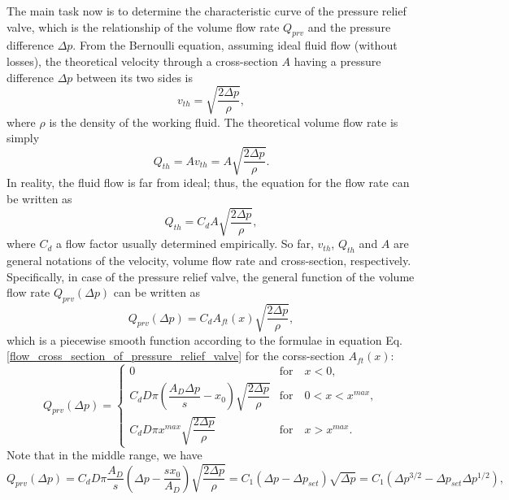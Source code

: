 The main task now is to determine the characteristic curve of the pressure relief valve, which is the relationship of the volume flow rate $Q_{prv}$ and the pressure difference $\Delta p$. From the Bernoulli equation, assuming ideal fluid flow (without losses), the theoretical velocity through a cross-section $A$ having a pressure difference $\Delta p$ between its two sides is
%
\begin{equation}
v_{th} = \sqrt{ \frac{2 \Delta p}{\rho} },
\end{equation}
%
where $\rho$ is the density of the working fluid. The theoretical volume flow rate is simply
%
\begin{equation}
Q_{th} = A v_{th} = A \sqrt{ \frac{2 \Delta p}{\rho} }.
\end{equation}
%
In reality, the fluid flow is far from ideal; thus, the equation for the flow rate can be written as
%
\begin{equation}
Q_{th} = C_d A \sqrt{ \frac{2 \Delta p}{\rho} },
\end{equation}
%
where $C_d$ a flow factor usually determined empirically. So far, $v_{th}$, $Q_{th}$ and $A$ are general notations of the velocity, volume flow rate and cross-section, respectively. Specifically, in case of the pressure relief valve, the general function of the volume flow rate $Q_{prv}(\Delta p)$ can be written as
%
\begin{equation}
Q_{prv}(\Delta p) = C_d A_{ft}(x) \sqrt{ \frac{2 \Delta p}{\rho} },
\end{equation}
%
which is a piecewise smooth function according to the formulae in equation Eq.\,\eqref{flow_cross_section_of_pressure_relief_valve} for the corss-section $A_{ft}(x)$:
%
\begin{equation} \label{general_volume_flow_rate_PRV}
Q_{prv}(\Delta p) =
	\begin{cases}
		0 & \mathrm{for} \quad x<0, \\
		C_d D \pi  \left( \dfrac{A_D \Delta p}{s} - x_0 \right) \sqrt{ \dfrac{2 \Delta p}{\rho} } & \mathrm{for} \quad 0<x<x^{max}, \\
		C_d D \pi x^{max} \sqrt{ \dfrac{2 \Delta p}{\rho} } & \mathrm{for} \quad x>x^{max}.
	\end{cases}
\end{equation}
%
Note that in the middle range, we have
%
\begin{equation} \label{volume_flow_rate_middle_range_PRV}
Q_{prv}(\Delta p) = C_d D \pi\frac{A_D}{s} \left( \Delta p - \frac{s x_0}{A_D} \right) \sqrt{ \frac{2 \Delta p}{\rho} } = C_1 \left( \Delta p - \Delta p_{set} \right) \sqrt{\Delta p} = C_1 \left( \Delta p^{3/2} - \Delta p_{set} \Delta p^{1/2} \right),
\end{equation}
